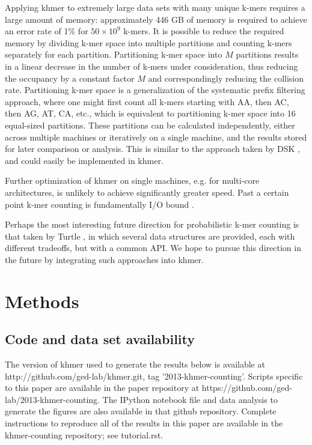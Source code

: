 \documentclass[10pt]{article}
\begin{document}
Applying khmer to extremely large data sets with many unique k-mers
requires a large amount of memory: approximately 446 GB of memory is
required to achieve an error rate of 1\% for
$50\times 10^9$ k-mers. It is possible to reduce the required memory by dividing
k-mer space into multiple partitions and counting k-mers separately
for each partition. Partitioning k-mer space into $M$ partitions
results in a linear decrease in the number of k-mers under
consideration, thus reducing the occupancy by a constant factor $M$
and correspondingly reducing the collision rate.  Partitioning k-mer
space is a generalization of the systematic prefix filtering approach,
where one might first count all k-mers starting with AA, then AC, then
AG, AT, CA, etc., which is equivalent to partitioning k-mer space into
16 equal-sized partitions. These partitions can be calculated
independently, either across multiple machines or iteratively on a
single machine, and the results stored for later comparison or
analysis.  This is similar to the approach taken by DSK
\cite{Rizk2013}, and could easily be implemented in khmer.

Further optimization of khmer on single machines, e.g. for multi-core
architectures, is unlikely to achieve significantly greater speed.
Past a certain point k-mer counting is fundamentally I/O bound
\cite{McDonald2013}.

Perhaps the most interesting future direction for probabilistic k-mer
counting is that taken by Turtle \cite{Roy2013}, in which several
data structures are provided, each with different tradeoffs, but with
a common API.  We hope to pursue this direction in the future by
integrating such approaches into khmer.

\section*{Methods}

\subsection*{Code and data set availability}


The version of khmer used to generate the results below is available
at http://github.com/ged-lab/khmer.git, tag '2013-khmer-counting'.
Scripts specific to this paper are available in the paper repository
at https://github.com/ged-lab/2013-khmer-counting.
The IPython\cite{4160251} notebook file and data analysis to generate the figures are also
available in that github repository.  Complete instructions to reproduce
all of the results in this paper are available in the khmer-counting
repository; see tutorial.rst.
\end{document}
